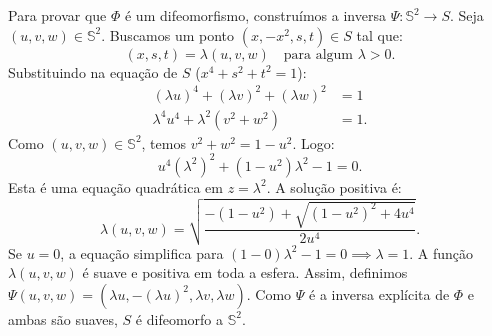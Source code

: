{	Para provar que $\Phi$ é um difeomorfismo, construímos a inversa $\Psi : \mathbb{S}^2 \to S$. Seja $(u,v,w) \in \mathbb{S}^2$. Buscamos um ponto $(x, -x^2, s, t) \in S$ tal que:
	\begin{equation*}
		(x, s, t) = \lambda(u, v, w) \quad \text{para algum } \lambda > 0.
	\end{equation*}
	Substituindo na equação de $S$ ($x^4 + s^2 + t^2 = 1$):
	\begin{align*}
		(\lambda u)^4 + (\lambda v)^2 + (\lambda w)^2 &= 1 \\
		\lambda^4 u^4 + \lambda^2 (v^2 + w^2) &= 1.
	\end{align*}
	Como $(u,v,w) \in \mathbb{S}^2$, temos $v^2+w^2 = 1-u^2$. Logo:
	\begin{equation*}
		u^4 (\lambda^2)^2 + (1-u^2)\lambda^2 - 1 = 0.
	\end{equation*}
	Esta é uma equação quadrática em $z = \lambda^2$. A solução positiva é:
	\begin{equation*}
		\lambda(u,v,w) = \sqrt{\frac{-(1-u^2) + \sqrt{(1-u^2)^2 + 4u^4}}{2u^4}}.
	\end{equation*}
	Se $u=0$, a equação simplifica para $(1-0)\lambda^2 - 1 = 0 \implies \lambda = 1$. A função $\lambda(u,v,w)$ é suave e positiva em toda a esfera. Assim, definimos $\Psi(u,v,w) = (\lambda u, -(\lambda u)^2, \lambda v, \lambda w)$. 
	Como $\Psi$ é a inversa explícita de $\Phi$ e ambas são suaves, $S$ é difeomorfo a $\mathbb{S}^2$.
}
